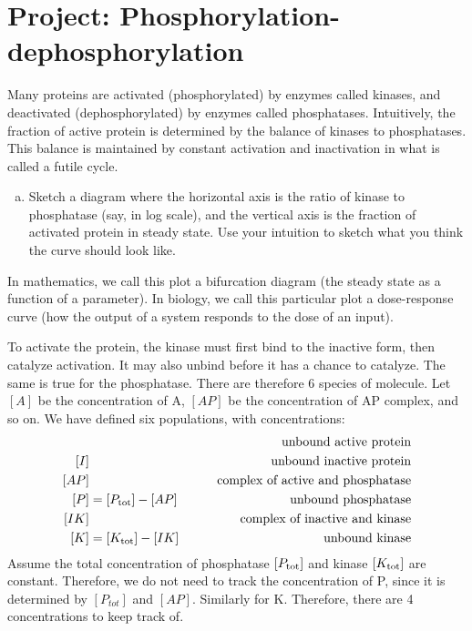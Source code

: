 \documentclass{exam}
\begin{document}
\section*{Project: Phosphorylation-dephosphorylation}
 
Many proteins are activated (phosphorylated) by enzymes called kinases, and deactivated (dephosphorylated) by enzymes called phosphatases. Intuitively, the fraction of active protein is determined by the balance of kinases to phosphatases. This balance is maintained by constant activation and inactivation in what is called a futile cycle.

\begin{enumerate}[a.]
\item Sketch a diagram where the horizontal axis is the ratio of kinase to phosphatase (say, in log scale), and the vertical axis is the fraction of activated protein in steady state. Use your intuition to sketch what you think the curve should look like.
\end{enumerate}
\vspace{2em}

In mathematics, we call this plot a bifurcation diagram (the steady state as a function of a parameter). In biology, we call this particular plot a dose-response curve (how the output of a system responds to the dose of an input). 

To activate the protein, the kinase must first bind to the inactive form, then catalyze activation. It may also unbind before it has a chance to catalyze. The same is true for the phosphatase. There are therefore 6 species of molecule.
Let $[A]$ be the concentration of A, $[AP]$ be the concentration of AP complex, and so on. We have defined six populations, with concentrations:
\begin{align*}
[A]&&\qquad \mbox{unbound active protein}\\
[I]&&\qquad \mbox{unbound inactive protein}\\
[AP]&&\qquad \mbox{complex of active and phosphatase}\\
[P] &= [P_{\rm tot}] - [AP] &\qquad \mbox{unbound phosphatase}\\
[IK]& &\qquad \mbox{complex of inactive and kinase}\\
[K] &= [K_{\rm tot}] - [IK] &\qquad \mbox{unbound kinase}
\end{align*}
Assume the total concentration of phosphatase $[P_{\rm tot}]$ and kinase $[K_{\rm tot}]$ are constant. Therefore, we do not need to track the concentration of P, since it is determined by $[P_{tot}]$ and $[AP]$. Similarly for K. Therefore, there are 4 concentrations to keep track of.
\end{document}
